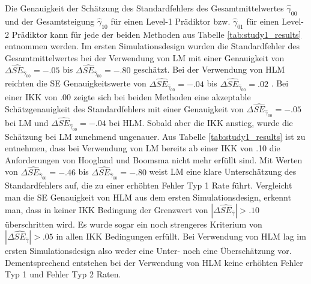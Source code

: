 \documentclass[12pt]{article}\usepackage[]{graphicx}\usepackage[]{color}
\begin{document}
Die Genauigkeit der Schätzung des Standardfehlers des Gesamtmittelwertes $\widehat{\gamma}_{00}$ und der Gesamtsteigung $\widehat{\gamma}_{10}$ für einen Level-1 Prädiktor bzw. $\widehat{\gamma}_{01}$ für einen Level-2 Prädiktor kann für jede der beiden Methoden aus Tabelle \ref{tab:study1_results} entnommen werden. Im ersten Simulationsdesign wurden die Standardfehler des Gesamtmittelwertes bei der Verwendung von LM mit einer Genauigkeit von $\Delta\widehat{SE}_{\widehat{\gamma}_{00}} = -.05$ bis $\Delta\widehat{SE}_{\widehat{\gamma}_{00}} = -.80$ geschätzt. Bei der Verwendung von HLM reichten die SE Genauigkeitswerte von $\Delta\widehat{SE}_{\widehat{\gamma}_{00}} = -.04$ bis $\Delta\widehat{SE}_{\widehat{\gamma}_{00}} = .02$ . Bei einer IKK von .00 zeigte sich bei beiden Methoden eine akzeptable Schätzgenauigkeit des Standardfehlers mit einer Genauigkeit von $\Delta\widehat{SE}_{\widehat{\gamma}_{00}} = -.05$ bei LM und $\Delta\widehat{SE}_{\widehat{\gamma}_{00}} = -.04$ bei HLM. Sobald aber die IKK anstieg, wurde die Schätzung bei LM zunehmend ungenauer. Aus Tabelle \ref{tab:study1_results} ist zu entnehmen, dass bei Verwendung von LM bereits ab einer IKK von .10 die Anforderungen von Hoogland und Boomsma \citeyearpar{hooglandboosma1998robustness} nicht mehr erfüllt sind. Mit Werten von $\Delta\widehat{SE}_{\widehat{\gamma}_{00}} = -.46$ bis $\Delta\widehat{SE}_{\widehat{\gamma}_{00}} = -.80$ weist LM eine klare Unterschätzung des Standardfehlers auf, die zu einer erhöhten Fehler Typ 1 Rate führt. Vergleicht man die SE Genauigkeit von HLM aus dem ersten Simulationsdesign, erkennt man, dass in keiner IKK Bedingung der Grenzwert von $|\Delta\widehat{SE}_{\widehat{\gamma}}| > .10$ überschritten wird. Es wurde sogar ein noch strengeres Kriterium von $|\Delta\widehat{SE}_{\widehat{\gamma}}| > .05$ in allen IKK Bedingungen erfüllt. Bei Verwendung von HLM lag im ersten Simulationsdesign also weder eine Unter- noch eine Überschätzung vor. Dementsprechend entstehen bei der Verwendung von HLM keine erhöhten Fehler Typ 1 und Fehler Typ 2 Raten.
\end{document}
